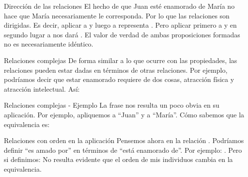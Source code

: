 
\begin{frame}{Dirección de las relaciones}
  El hecho de que Juan esté enamorado de María no hace que María necesariamente
  le corresponda. Por lo que las relaciones son dirigidas.
  \jump
  Es decir, aplicar  a  y luego
  a  representa .
  Pero aplicar   primero a  y
  en segundo lugar a  nos dará .
  \jump
  El valor de verdad de ambas proposiciones formadas no es necesariamente idéntico.
  \jump
\end{frame}


\begin{frame}{Relaciones complejas}
  De forma similar a lo que ocurre con las propiedades, las relaciones pueden
  estar dadas en términos de otras relaciones.
  \jump
  Por ejemplo, podríamos decir que estar enamorado requiere de dos cosas,
  atracción física y atracción intelectual. Así:
  \jump
\end{frame}


\begin{frame}{Relaciones complejas - Ejemplo}
  La frase  nos resulta un poco obvia en su aplicación.
  \jump
  Por ejemplo, apliquemos  a ``Juan'' y a ``María''.
  \jump
  Cómo sabemos que la equivalencia es:
  \jump
\end{frame}


\begin{frame}{Relaciones con orden en la aplicación}
  Pensemos ahora en la relación . Podríamos definir
  ``es amado por'' en términos de ``está enamorado de''. Por ejemplo:
  .
  \jump
  Pero si definimos:
  \jump
  \jump
  No resulta evidente que el orden de mis individuos cambia en la equivalencia.
\end{frame}

